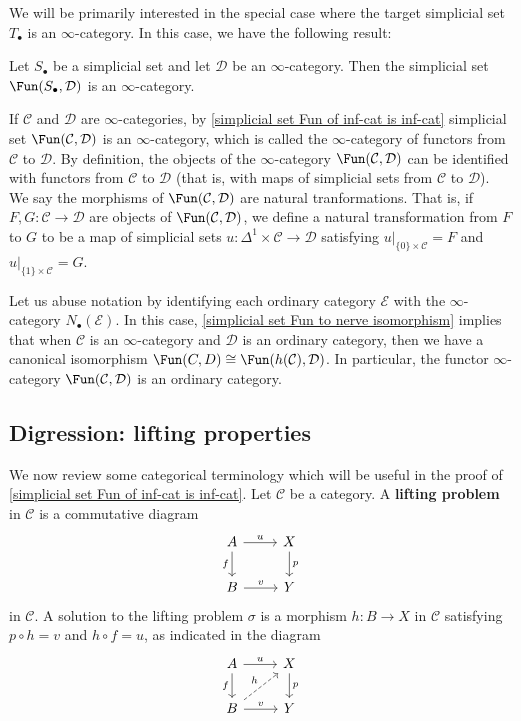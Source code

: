 We will be primarily interested in the special case where the target simplicial set $T_\bullet$ is an $\infty$-category. In this case, we have the following result:
\begin{theorem}\label{simplicial set Fun of inf-cat is inf-cat}
Let $S_\bullet$ be a simplicial set and let $\mathcal{D}$ be an $\infty$-category. Then the simplicial set $\Fun(S_\bullet,\mathcal{D})$ is an $\infty$-category.
\end{theorem}
If $\mathcal{C}$ and $\mathcal{D}$ are $\infty$-categories, by \cref{simplicial set Fun of inf-cat is inf-cat} simplicial set $\Fun(\mathcal{C},\mathcal{D})$ is an $\infty$-category, which is called the $\infty$-category of functors from $\mathcal{C}$ to $\mathcal{D}$. By definition, the objects of the $\infty$-category $\Fun(\mathcal{C},\mathcal{D})$ can be identified with functors from $\mathcal{C}$ to $\mathcal{D}$ (that is, with maps of simplicial sets from $\mathcal{C}$ to $\mathcal{D}$). We say the morphisms of $\Fun(\mathcal{C},\mathcal{D})$ are natural tranformations. That is, if $F,G:\mathcal{C}\to\mathcal{D}$ are objects of $\Fun(\mathcal{C},\mathcal{D})$, we define a natural transformation from $F$ to $G$ to be a map of simplicial sets $u:\Delta^1\times\mathcal{C}\to\mathcal{D}$ satisfying $u|_{\{0\}\times\mathcal{C}}=F$ and $u|_{\{1\}\times\mathcal{C}}=G$.\par
Let us abuse notation by identifying each ordinary category $\mathcal{E}$ with the $\infty$-category $N_\bullet(\mathcal{E})$. In this case, \cref{simplicial set Fun to nerve isomorphism} implies that when $\mathcal{C}$ is an $\infty$-category and $\mathcal{D}$ is an ordinary category, then we have a canonical isomorphism $\Fun(C,D)\cong\Fun(h(\mathcal{C}),\mathcal{D})$. In particular, the functor $\infty$-category $\Fun(\mathcal{C},\mathcal{D})$ is an ordinary category.
\subsection{Digression: lifting properties}
We now review some categorical terminology which will be useful in the proof of \cref{simplicial set Fun of inf-cat is inf-cat}. Let $\mathcal{C}$ be a category. A \textbf{lifting problem} in $\mathcal{C}$ is a commutative diagram
\[\begin{tikzcd}
A\ar[r,"u"]\ar[d,swap,"f"]&X\ar[d,"p"]\\
B\ar[r,"v"]&Y
\end{tikzcd}\]
in $\mathcal{C}$. A solution to the lifting problem $\sigma$ is a morphism $h:B\to X$ in $\mathcal{C}$ satisfying $p\circ h=v$ and $h\circ f=u$, as indicated in the diagram
\[\begin{tikzcd}
A\ar[r,"u"]\ar[d,swap,"f"]&X\ar[d,"p"]\\
B\ar[r,"v"]\ar[ru,dashed,"h"]&Y
\end{tikzcd}\]

